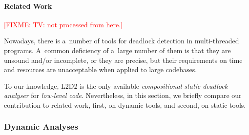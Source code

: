 \documentclass[runningheads]{llncs}
\newcommand{\fixme}[1]{\textcolor{red}{[FIXME: #1]}}
\newcommand{\LLDD}{\textsc{L2D2}\xspace} %
\begin{document}
%
%

\vspace*{-3mm}\paragraph{Related Work} %

\fixme{TV: not processed from here.}

Nowadays, there is a~number of tools for deadlock detection in
multi-threaded programs. A~common deficiency of a~large number of them
is that they are unsound and/or incomplete, or they are precise, but
their requirements on time and resources are unacceptable when applied to
large codebases.

To our knowledge, \LLDD is the only available \emph{compositional static
deadlock analyser} for \emph{low-level code}. Nevertheless, in this section, we
briefly compare our contribution to related work, first, on dynamic tools, and
second, on static tools.

\enlargethispage{4mm}

\vspace*{-4mm}\subsubsection{Dynamic Analyses}
\end{document}
